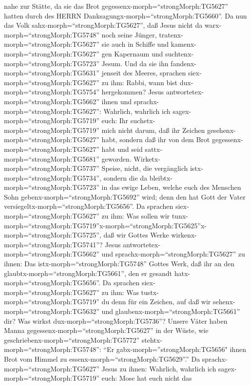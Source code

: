 nahe zur Stätte, da sie das Brot gegessenx-morph=``strongMorph:TG5627''
hatten durch des HERRN Danksagungx-morph=``strongMorph:TG5660''.
 Da nun das Volk sahx-morph=``strongMorph:TG5627'', daß
Jesus nicht da warx-morph=``strongMorph:TG5748'' noch seine Jünger,
tratenx-morph=``strongMorph:TG5627'' sie auch in Schiffe und
kamenx-morph=``strongMorph:TG5627'' gen Kapernaum und
suchtenx-morph=``strongMorph:TG5723'' Jesum.  Und da sie
ihn fandenx-morph=``strongMorph:TG5631'' jenseit des Meeres, sprachen
siex-morph=``strongMorph:TG5627'' zu ihm: Rabbi, wann bist
dux-morph=``strongMorph:TG5754'' hergekommen?  Jesus
antwortetex-morph=``strongMorph:TG5662'' ihnen und
sprachx-morph=``strongMorph:TG5627'': Wahrlich, wahrlich ich
sagex-morph=``strongMorph:TG5719'' euch: Ihr
suchetx-morph=``strongMorph:TG5719'' mich nicht darum, daß ihr Zeichen
gesehenx-morph=``strongMorph:TG5627'' habt, sondern daß ihr von dem Brot
gegessenx-morph=``strongMorph:TG5627'' habt und seid
sattx-morph=``strongMorph:TG5681'' geworden. 
Wirketx-morph=``strongMorph:TG5737'' Speise, nicht, die vergänglich
istx-morph=``strongMorph:TG5734'', sondern die da
bleibtx-morph=``strongMorph:TG5723'' in das ewige Leben, welche euch des
Menschen Sohn gebenx-morph=``strongMorph:TG5692'' wird; denn den hat
Gott der Vater versiegeltx-morph=``strongMorph:TG5656''. 
Da sprachen siex-morph=``strongMorph:TG5627'' zu ihm: Was sollen wir
tunx-morph=``strongMorph:TG5719''\textbar x-morph=``strongMorph:TG5625''x-morph=``strongMorph:TG5725'',
daß wir Gottes Werke wirkenx-morph=``strongMorph:TG5741''? 
Jesus antwortetex-morph=``strongMorph:TG5662'' und
sprachx-morph=``strongMorph:TG5627'' zu ihnen: Das
istx-morph=``strongMorph:TG5748'' Gottes Werk, daß ihr an den
glaubtx-morph=``strongMorph:TG5661'', den er gesandt
hatx-morph=``strongMorph:TG5656''.  Da sprachen
siex-morph=``strongMorph:TG5627'' zu ihm: Was
tustx-morph=``strongMorph:TG5719'' du denn für ein Zeichen, auf daß wir
sehenx-morph=``strongMorph:TG5632'' und
glaubenx-morph=``strongMorph:TG5661'' dir? Was wirkst
dux-morph=``strongMorph:TG5736''?  Unsere Väter haben Manna
gegessenx-morph=``strongMorph:TG5627'' in der Wüste, wie
geschriebenx-morph=``strongMorph:TG5772''
stehtx-morph=``strongMorph:TG5748'': ``Er
gabx-morph=''strongMorph:TG5656" ihnen Brot vom Himmel zu
essenx-morph=``strongMorph:TG5629''.''  Da
sprachx-morph=``strongMorph:TG5627'' Jesus zu ihnen: Wahrlich, wahrlich
ich sagex-morph=``strongMorph:TG5719'' euch: Mose hat euch nicht das
